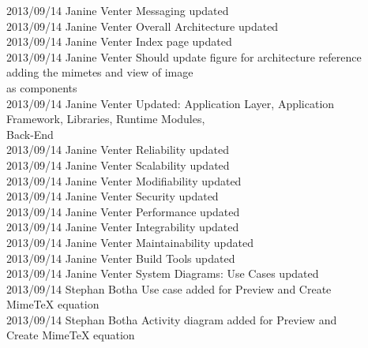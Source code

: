 \documentclass[29pt,a4paper]{moderncv}
\begin{document}
\begin{tabbing}
2013/09/14  \> Janine Venter \> Messaging updated\\
2013/09/14  \> Janine Venter \> Overall Architecture updated\\
2013/09/14  \> Janine Venter \> Index page updated\\
2013/09/14  \> Janine Venter \> Should update figure for architecture reference \\ \> \> \> adding the mimetes and view of image \\ \> \> \> as components\\
2013/09/14  \> Janine Venter \> Updated: Application Layer, Application \\ \> \> \> Framework, Libraries, Runtime Modules, \\ \> \> \> Back-End\\
2013/09/14  \> Janine Venter \> Reliability updated\\
2013/09/14  \> Janine Venter \> Scalability updated\\
2013/09/14  \> Janine Venter \>Modifiability updated\\
2013/09/14  \> Janine Venter \> Security updated\\
2013/09/14  \> Janine Venter \> Performance updated\\
2013/09/14  \> Janine Venter \> Integrability updated\\
2013/09/14  \> Janine Venter \> Maintainability updated\\
2013/09/14  \> Janine Venter \> Build Tools updated\\
2013/09/14  \> Janine Venter \>System Diagrams: Use Cases updated\\
2013/09/14  \> Stephan Botha \> Use case added for  Preview and Create \\ \> \> \> MimeTeX equation\\
2013/09/14  \> Stephan Botha \> Activity diagram added for Preview and \\ \> \> \> Create MimeTeX equation\\



\end{tabbing}


\newpage
\end{document}
